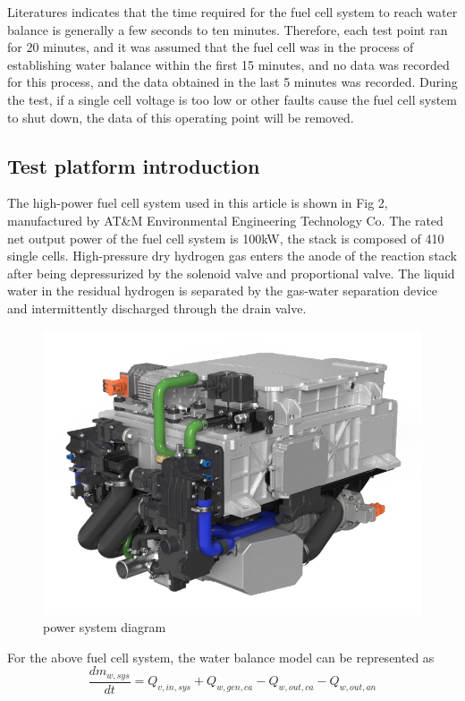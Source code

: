 Literatures\cite{wuDiagnosticToolsPEM2008} indicates that the time required for the fuel cell system to reach water balance is generally a few seconds to ten minutes. Therefore, each test point ran for 20 minutes, and it was assumed that the fuel cell was in the process of establishing water balance within the first 15 minutes, and no data was recorded for this process, and the data obtained in the last 5 minutes was recorded. During the test, if a single cell voltage is too low or other faults cause the fuel cell system to shut down, the data of this operating point will be removed.


\subsection{Test platform introduction}
The high-power fuel cell system used in this article is shown in Fig 2, manufactured by AT\&M Environmental Engineering Technology Co. The rated net output power of the fuel cell system is 100kW, the stack is composed of 410 single cells. High-pressure dry hydrogen gas enters the anode of the reaction stack after being depressurized by the solenoid valve and proportional valve. The liquid water in the residual hydrogen is separated by the gas-water separation device and intermittently discharged through the drain valve.
\begin{figure}[h]
	\centering
	\label{fig:PowerSystemDiagram}
	\includegraphics[scale=0.4]{Research_pictures/picture2.png}
	\caption[short]{power system diagram}
\end{figure}

For the above fuel cell system, the water balance model can be represented as
\begin{equation} \label{waterBalanceModel}
	\frac{d m_{w,s y s}}{d t}=Q_{v,i n,s y s}+Q_{w,g e n,c a}-Q_{w,o u t,c a}-Q_{w,o u t,a n}
\end{equation}

